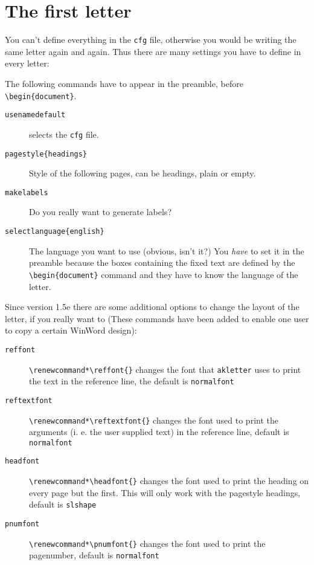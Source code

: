 \documentclass[a4paper]{article}
\begin{document}
\section{The first letter}

You can't define everything in the \texttt{cfg} file, otherwise you 
would be writing the same letter again and again. Thus there are many 
settings you have to define in every letter:

The following commands have to appear in the preamble, before
\verb+\begin{document}+.

\begin{description}
	
\item [\texttt{usename{default}}] selects the \texttt{cfg} file.

\item [\texttt{pagestyle\{headings\}}] Style of the following pages,
can be headings, plain or empty.

\item [\texttt{makelabels}] Do you really want to generate labels?

\item [\texttt{selectlanguage\{english\}}] The language you want to
use (obvious, isn't it?) You \emph{have} to set it in the preamble
because the boxes containing the fixed text are defined by the
\verb+\begin{document}+ command and they have to know the language of
the letter.

\end{description}

Since version 1.5e there are some additional options to change the 
layout of the letter, if you really want to (These commands have been 
added to enable one user to copy a certain WinWord design):

\begin{description}
	\item[\texttt{reffont}]  \verb+\renewcommand*\reffont{}+ changes the 
	font that \texttt{akletter} uses to print the text in the reference 
	line, the default is \texttt{normalfont}

	
	\item[\texttt{reftextfont}] \verb+\renewcommand*\reftextfont{}+ 
	changes the font used to print the arguments (i. e. the user supplied 
	text) in the reference line, default is \texttt{normalfont}

	\item[\texttt{headfont}] \verb+\renewcommand*\headfont{}+ changes 
	the font used to print the heading on every page but the first. This 
	will only work with the pagestyle headings, default is \texttt{slshape}

	\item[\texttt{pnumfont}] \verb+\renewcommand*\pnumfont{}+ changes the 
	font used to print the pagenumber, default is \texttt{normalfont}
	
\end{description}
\end{document}
